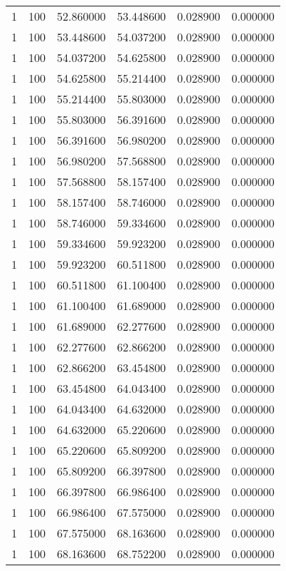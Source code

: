 \begin{longtable}{rrrrrr}
1 & 100 & 52.860000 & 53.448600 & 0.028900 & 0.000000 \\
1 & 100 & 53.448600 & 54.037200 & 0.028900 & 0.000000 \\
1 & 100 & 54.037200 & 54.625800 & 0.028900 & 0.000000 \\
1 & 100 & 54.625800 & 55.214400 & 0.028900 & 0.000000 \\
1 & 100 & 55.214400 & 55.803000 & 0.028900 & 0.000000 \\
1 & 100 & 55.803000 & 56.391600 & 0.028900 & 0.000000 \\
1 & 100 & 56.391600 & 56.980200 & 0.028900 & 0.000000 \\
1 & 100 & 56.980200 & 57.568800 & 0.028900 & 0.000000 \\
1 & 100 & 57.568800 & 58.157400 & 0.028900 & 0.000000 \\
1 & 100 & 58.157400 & 58.746000 & 0.028900 & 0.000000 \\
1 & 100 & 58.746000 & 59.334600 & 0.028900 & 0.000000 \\
1 & 100 & 59.334600 & 59.923200 & 0.028900 & 0.000000 \\
1 & 100 & 59.923200 & 60.511800 & 0.028900 & 0.000000 \\
1 & 100 & 60.511800 & 61.100400 & 0.028900 & 0.000000 \\
1 & 100 & 61.100400 & 61.689000 & 0.028900 & 0.000000 \\
1 & 100 & 61.689000 & 62.277600 & 0.028900 & 0.000000 \\
1 & 100 & 62.277600 & 62.866200 & 0.028900 & 0.000000 \\
1 & 100 & 62.866200 & 63.454800 & 0.028900 & 0.000000 \\
1 & 100 & 63.454800 & 64.043400 & 0.028900 & 0.000000 \\
1 & 100 & 64.043400 & 64.632000 & 0.028900 & 0.000000 \\
1 & 100 & 64.632000 & 65.220600 & 0.028900 & 0.000000 \\
1 & 100 & 65.220600 & 65.809200 & 0.028900 & 0.000000 \\
1 & 100 & 65.809200 & 66.397800 & 0.028900 & 0.000000 \\
1 & 100 & 66.397800 & 66.986400 & 0.028900 & 0.000000 \\
1 & 100 & 66.986400 & 67.575000 & 0.028900 & 0.000000 \\
1 & 100 & 67.575000 & 68.163600 & 0.028900 & 0.000000 \\
1 & 100 & 68.163600 & 68.752200 & 0.028900 & 0.000000 \\

\end{longtable}
